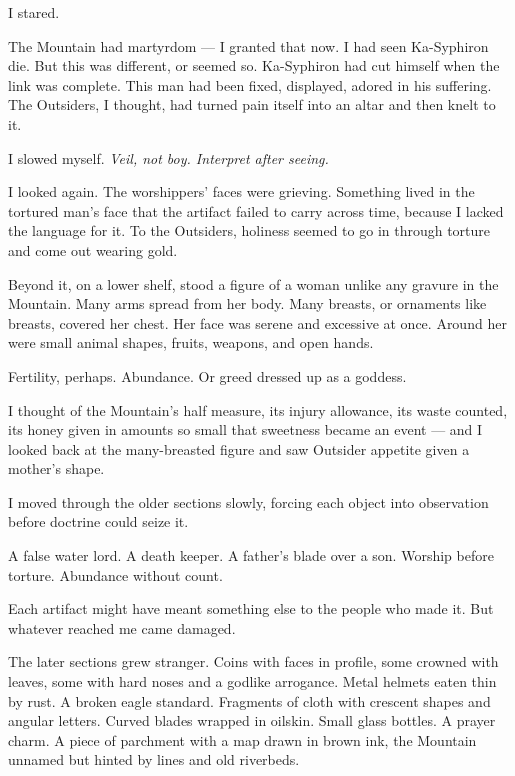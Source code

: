 I stared.\par

The Mountain had martyrdom --- I granted that now. I had seen Ka-Syphiron die. But this was different, or seemed so. Ka-Syphiron had cut himself when the link was complete. This man had been fixed, displayed, adored in his suffering. The Outsiders, I thought, had turned pain itself into an altar and then knelt to it.\par

I slowed myself. \textit{Veil, not boy. Interpret after seeing.}\par

I looked again. The worshippers' faces were grieving. Something lived in the tortured man's face that the artifact failed to carry across time, because I lacked the language for it. To the Outsiders, holiness seemed to go in through torture and come out wearing gold.\par

Beyond it, on a lower shelf, stood a figure of a woman unlike any gravure in the Mountain. Many arms spread from her body. Many breasts, or ornaments like breasts, covered her chest. Her face was serene and excessive at once. Around her were small animal shapes, fruits, weapons, and open hands.\par

Fertility, perhaps. Abundance. Or greed dressed up as a goddess.\par

I thought of the Mountain's half measure, its injury allowance, its waste counted, its honey given in amounts so small that sweetness became an event --- and I looked back at the many-breasted figure and saw Outsider appetite given a mother's shape.\par

I moved through the older sections slowly, forcing each object into observation before doctrine could seize it.\par

A false water lord. A death keeper. A father's blade over a son. Worship before torture. Abundance without count.\par

Each artifact might have meant something else to the people who made it. But whatever reached me came damaged.\par

The later sections grew stranger. Coins with faces in profile, some crowned with leaves, some with hard noses and a godlike arrogance. Metal helmets eaten thin by rust. A broken eagle standard. Fragments of cloth with crescent shapes and angular letters. Curved blades wrapped in oilskin. Small glass bottles. A prayer charm. A piece of parchment with a map drawn in brown ink, the Mountain unnamed but hinted by lines and old riverbeds.\par

